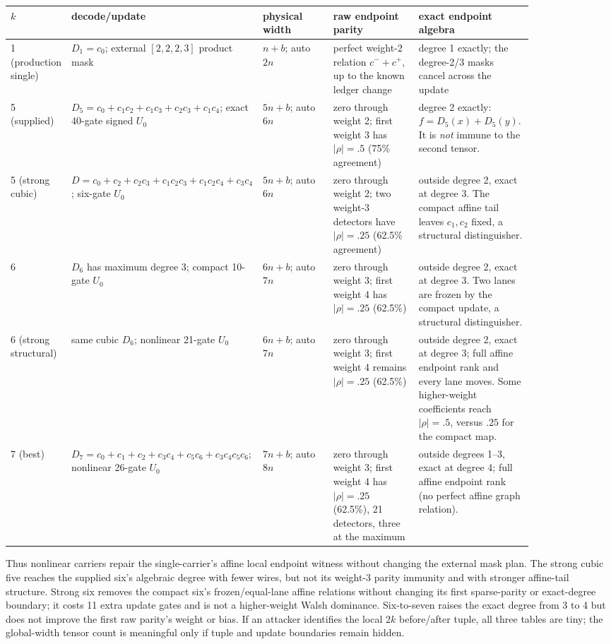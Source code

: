 \documentclass[11pt]{article}
\begin{document}
\begin{longtable}{@{}p{0.08\linewidth}p{0.25\linewidth}p{0.14\linewidth}p{0.17\linewidth}p{0.22\linewidth}@{}}
\toprule
$k$ & decode/update & physical width & raw endpoint parity & exact endpoint algebra \\
\midrule
1 (production single) & $D_1=c_0$; external $[2,2,2,3]$ product mask & $n+b$; auto $2n$ & perfect weight-2 relation $c^-+c^+$, up to the known ledger change & degree 1 exactly; the degree-2/3 masks cancel across the update \\
5 (supplied) & $D_5=c_0+c_1c_2+c_1c_3+c_2c_3+c_1c_4$; exact 40-gate signed $U_0$ & $5n+b$; auto $6n$ & zero through weight 2; first weight 3 has $|\rho|=.5$ (75\% agreement) & degree 2 exactly: $f=D_5(x)+D_5(y)$.  It is \emph{not} immune to the second tensor. \\
5 (strong cubic) & $D=c_0+c_2+c_2c_3+c_1c_2c_3+c_1c_2c_4+c_3c_4$; six-gate $U_0$ & $5n+b$; auto $6n$ & zero through weight 2; two weight-3 detectors have $|\rho|=.25$ (62.5\% agreement) & outside degree 2, exact at degree 3.  The compact affine tail leaves $c_1,c_2$ fixed, a structural distinguisher. \\
6 & $D_6$ has maximum degree 3; compact 10-gate $U_0$ & $6n+b$; auto $7n$ & zero through weight 3; first weight 4 has $|\rho|=.25$ (62.5\%) & outside degree 2, exact at degree 3.  Two lanes are frozen by the compact update, a structural distinguisher. \\
6 (strong structural) & same cubic $D_6$; nonlinear 21-gate $U_0$ & $6n+b$; auto $7n$ & zero through weight 3; first weight 4 remains $|\rho|=.25$ (62.5\%) & outside degree 2, exact at degree 3; full affine endpoint rank and every lane moves. Some higher-weight coefficients reach $|\rho|=.5$, versus $.25$ for the compact map. \\
7 (best) & $D_7=c_0+c_1+c_2+c_3c_4+c_5c_6+c_3c_4c_5c_6$; nonlinear 26-gate $U_0$ & $7n+b$; auto $8n$ & zero through weight 3; first weight 4 has $|\rho|=.25$ (62.5\%), 21 detectors, three at the maximum & outside degrees 1--3, exact at degree 4; full affine endpoint rank (no perfect affine graph relation). \\
\bottomrule
\end{longtable}

Thus nonlinear carriers repair the single-carrier's affine local endpoint
witness without changing the external mask plan.  The strong cubic five
reaches the supplied six's algebraic degree with
fewer wires, but not its weight-3 parity immunity and with stronger affine-tail
structure.  Strong six removes the compact six's frozen/equal-lane affine
relations without changing its first sparse-parity or exact-degree boundary;
it costs 11 extra update gates and is not a higher-weight Walsh dominance.
Six-to-seven raises the exact degree from 3 to 4 but does not improve
the first raw parity's weight or bias.  If an attacker identifies the local
$2k$ before/after tuple, all three tables are tiny; the global-width tensor
count is meaningful only if tuple and update boundaries remain hidden.
\end{document}
